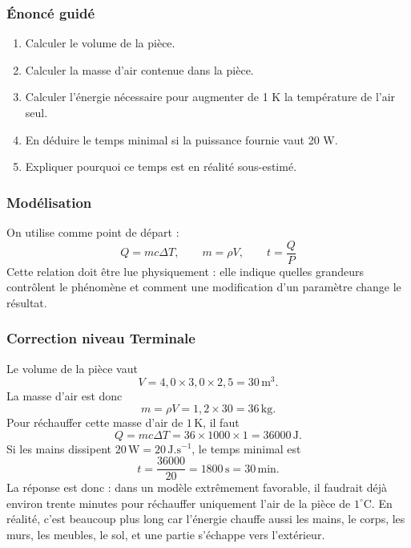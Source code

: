 \documentclass[11pt,a4paper]{article}
\begin{document}
\subsubsection*{Énoncé guidé}

\begin{enumerate}
  \item Calculer le volume de la pièce.
  \item Calculer la masse d'air contenue dans la pièce.
  \item Calculer l'énergie nécessaire pour augmenter de 1 K la température de l'air seul.
  \item En déduire le temps minimal si la puissance fournie vaut 20 W.
  \item Expliquer pourquoi ce temps est en réalité sous-estimé.
\end{enumerate}

\subsubsection*{Modélisation}

\begin{theorembox}
On utilise comme point de départ :
\[
Q=mc\Delta T,\qquad m=\rho V,\qquad t=\frac{Q}{P}
\]
Cette relation doit être lue physiquement : elle indique quelles grandeurs contrôlent le phénomène et comment une modification d'un paramètre change le résultat.
\end{theorembox}

\subsubsection*{Correction niveau Terminale}

\begin{corrigebox}

Le volume de la pièce vaut
\[
V=4{,}0\times3{,}0\times2{,}5=30\,\mathrm{m^3}.
\]
La masse d'air est donc
\[
m=\rho V=1{,}2\times30=36\,\mathrm{kg}.
\]
Pour réchauffer cette masse d'air de \(1\,\mathrm K\), il faut
\[
Q=mc\Delta T=36\times1000\times1=36000\,\mathrm J.
\]
Si les mains dissipent \(20\,\mathrm W=20\,\mathrm{J.s^{-1}}\), le temps minimal est
\[
t=\frac{36000}{20}=1800\,\mathrm s=30\,\mathrm{min}.
\]
La réponse est donc : dans un modèle extrêmement favorable, il faudrait déjà environ trente minutes pour réchauffer uniquement l'air de la pièce de \(1^\circ\mathrm C\). En réalité, c'est beaucoup plus long car l'énergie chauffe aussi les mains, le corps, les murs, les meubles, le sol, et une partie s'échappe vers l'extérieur.

\end{corrigebox}
\end{document}
